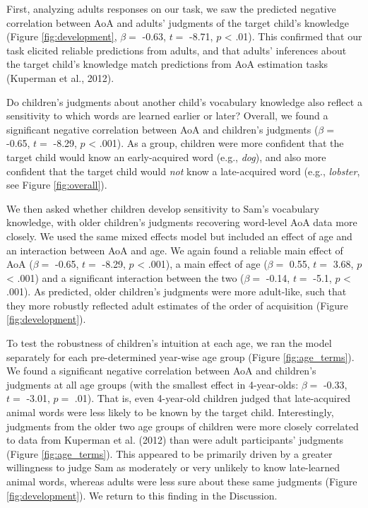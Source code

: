 \documentclass[10pt, letterpaper]{article}
\begin{document}
First, analyzing adults responses on our task, we saw the predicted
negative correlation between AoA and adults' judgments of the target
child's knowledge (Figure \ref{fig:development}, \(\beta =\) -0.63,
\(t =\) -8.71, \(p\) \textless{} .01). This confirmed that our task
elicited reliable predictions from adults, and that adults' inferences
about the target child's knowledge match predictions from AoA estimation
tasks (Kuperman et al., 2012).

Do children's judgments about another child's vocabulary knowledge also
reflect a sensitivity to which words are learned earlier or later?
Overall, we found a significant negative correlation between AoA and
children's judgments (\(\beta =\) -0.65, \(t =\) -8.29, \(p\)
\textless{} .001). As a group, children were more confident that the
target child would know an early-acquired word (e.g., \emph{dog}), and
also more confident that the target child would \emph{not} know a
late-acquired word (e.g., \emph{lobster}, see Figure \ref{fig:overall}).

We then asked whether children develop sensitivity to Sam's vocabulary
knowledge, with older children's judgments recovering word-level AoA
data more closely. We used the same mixed effects model but included an
effect of age and an interaction between AoA and age. We again found a
reliable main effect of AoA (\(\beta =\) -0.65, \(t =\) -8.29, \(p\)
\textless{} .001), a main effect of age (\(\beta =\) 0.55, \(t =\) 3.68,
\(p\) \textless{} .001) and a significant interaction between the two
(\(\beta =\) -0.14, \(t =\) -5.1, \(p\) \textless{} .001). As predicted,
older children's judgments were more adult-like, such that they more
robustly reflected adult estimates of the order of acquisition (Figure
\ref{fig:development}).

To test the robustness of children's intuition at each age, we ran the
model separately for each pre-determined year-wise age group (Figure
\ref{fig:age_terms}). We found a significant negative correlation
between AoA and children's judgments at all age groups (with the
smallest effect in 4-year-olds: \(\beta =\) -0.33, \(t =\) -3.01,
\(p =\) .01). That is, even 4-year-old children judged that
late-acquired animal words were less likely to be known by the target
child. Interestingly, judgments from the older two age groups of
children were more closely correlated to data from Kuperman et al.
(2012) than were adult participants' judgments (Figure
\ref{fig:age_terms}). This appeared to be primarily driven by a greater
willingness to judge Sam as moderately or very unlikely to know
late-learned animal words, whereas adults were less sure about these
same judgments (Figure \ref{fig:development}). We return to this finding
in the Discussion.
\end{document}
